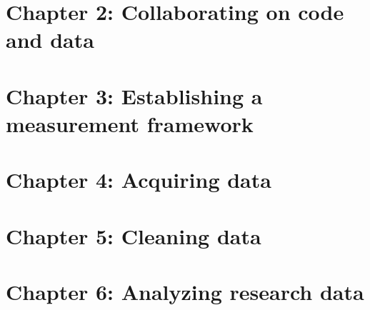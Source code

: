 \chapter{Chapter 2: Collaborating on code and data}
\label{ch:2}





\chapter{Chapter 3: Establishing a measurement framework}
\label{ch:3}






\chapter{Chapter 4: Acquiring data}
\label{ch:4}






\chapter{Chapter 5: Cleaning data}
\label{ch:5}




\chapter{Chapter 6: Analyzing research data}
\label{ch:6}

